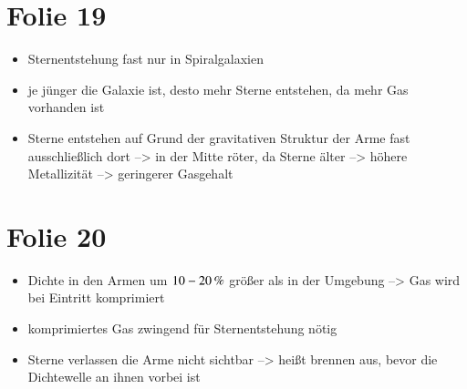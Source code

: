 \section{Folie 19}

\begin{itemize}
\item Sternentstehung fast nur in Spiralgalaxien
\item je jünger die Galaxie ist, desto mehr Sterne entstehen, da mehr Gas vorhanden ist
\item Sterne entstehen auf Grund der gravitativen Struktur der Arme fast ausschließlich dort --> in der Mitte röter, da Sterne älter --> höhere Metallizität --> geringerer Gasgehalt
\end{itemize}


\section{Folie 20}

\begin{itemize}
\item Dichte in den Armen um $\unit[10-20]{\%}$ größer als in der Umgebung --> Gas wird bei Eintritt komprimiert
\item komprimiertes Gas zwingend für Sternentstehung nötig
\item Sterne verlassen die Arme nicht sichtbar --> heißt brennen aus, bevor die Dichtewelle an ihnen vorbei ist
\end{itemize}



